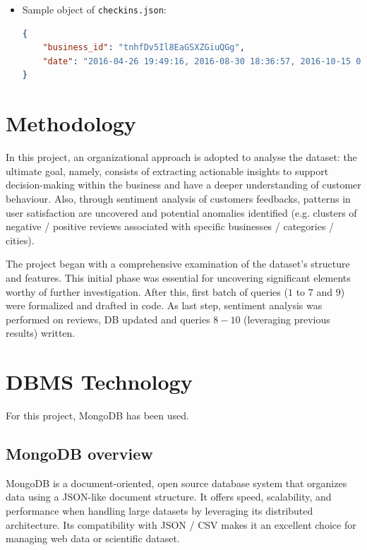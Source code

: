 \documentclass{Configuration_Files/PoliMi3i_thesis}
\begin{document}
\begin{itemize}
\bigskip

\item Sample object of \texttt{checkins.json}:
\bigskip
\begin{lstlisting}[language=json]
{
    "business_id": "tnhfDv5Il8EaGSXZGiuQGg",
    "date": "2016-04-26 19:49:16, 2016-08-30 18:36:57, 2016-10-15 02:45:18, 2016-11-18 01:54:50, 2017-04-20 18:39:06, 2017-05-03 17:58:02"
}
\end{lstlisting}

\end{itemize}

\section{Methodology}
In this project, an organizational approach is adopted to analyse the dataset: the ultimate goal, namely, consists of extracting actionable insights to support decision-making within the business and have a deeper understanding of customer behaviour. Also, through sentiment analysis of customers feedbacks, patterns in user satisfaction are uncovered and potential anomalies identified (e.g. clusters of negative / positive reviews associated with specific businesses / categories / cities).

\bigskip

The project began with a comprehensive examination of the dataset’s structure and features. This initial phase was essential for uncovering significant elements worthy of further investigation. After this, first batch of queries ($1$ to $7$ and $9$) were formalized and drafted in code. As last step, sentiment analysis was performed on reviews, DB updated and queries $8 - 10$ (leveraging previous results) written.  

\section{DBMS Technology}
For this project, MongoDB has been used.

\subsection{MongoDB overview}
MongoDB is a document-oriented, open source database system that organizes data using a JSON-like document structure. It offers speed, scalability, and performance when handling large datasets by leveraging its distributed architecture. Its compatibility with JSON / CSV makes it an excellent choice for managing web data or scientific dataset.
\end{document}
